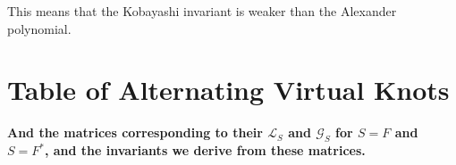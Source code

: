 \documentclass[12pt]{report}
\newcommand{\notered}[1]{{\color{Red} \textbf{#1}}}
\begin{document}
This means that the Kobayashi invariant is weaker than the Alexander polynomial.


\newpage
\printbibliography[title=References]


\appendix
{}
\titlespacing*{\chapter}{0pt}{40pt}{30pt}

\chapter{Table of Alternating Virtual Knots}

\notered{And the matrices corresponding to their $\mathcal{L}_{S}$ and $\mathcal{G}_{S}$ for $S = F$ and $S = F^{*}$, and the invariants we derive from these matrices.}
\end{document}
